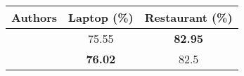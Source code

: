 \begin{tabular}{|c|c|c|}
\hline
Authors & Laptop (\%) & Restaurant (\%)\\
\hline
\cite{cwr_tdsa_models_zhaoa2019modeling}   & 75.55 &  \textbf{82.95}\\
\hline
\cite{cwr_tdsa_models_zeng2019lcf}   & \textbf{76.02} &  82.5\\
\hline
\end{tabular}